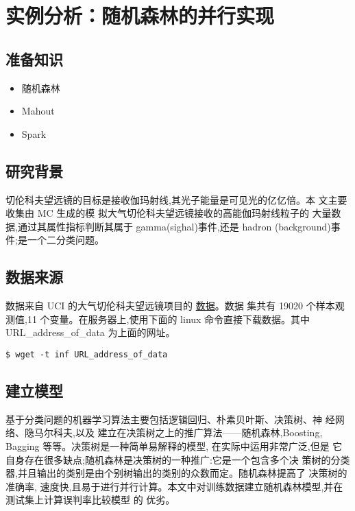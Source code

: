 \section{实例分析：随机森林的并行实现}\label{ux5b9eux4f8bux5206ux6790ux968fux673aux68eeux6797ux7684ux5e76ux884cux5b9eux73b0}

\subsection{准备知识}\label{ux51c6ux5907ux77e5ux8bc6}

\begin{itemize}
\itemsep1pt\parskip0pt
\item
  随机森林
\item
  Mahout
\item
  Spark
\end{itemize}

\subsection{研究背景}\label{ux7814ux7a76ux80ccux666f}

切伦科夫望远镜的目标是接收伽玛射线,其光子能量是可见光的亿亿倍。本
文主要收集由 MC 生成的模 拟大气切伦科夫望远镜接收的高能伽玛射线粒子的
大量数据,通过其属性指标判断其属于 gamma(sighal)事件,还是 hadron
(background)事件;是一个二分类问题。

\subsection{数据来源}\label{ux6570ux636eux6765ux6e90}

数据来自 UCI 的大气切伦科夫望远镜项目的
\href{http://archive.ics.uci.edu/ml/machine-learning-databases/magic/magic04.data}{数据}。数据
集共有 19020 个样本观测值,11 个变量。在服务器上,使用下面的 linux
命令直接下载数据。其中 URL\_address\_of\_data 为上面的网址。

\begin{lstlisting}
$ wget -t inf URL_address_of_data
\end{lstlisting}

\subsection{建立模型}\label{ux5efaux7acbux6a21ux578b}

基于分类问题的机器学习算法主要包括逻辑回归、朴素贝叶斯、决策树、神
经网络、隐马尔科夫,以及
建立在决策树之上的推广算法------随机森林,Boosting, Bagging
等等。决策树是一种简单易解释的模型, 在实际中运用非常广泛,但是
它自身存在很多缺点;随机森林是决策树的一种推广:它是一个包含多个决
策树的分类器,并且输出的类别是由个别树输出的类别的众数而定。随机森林提高了
决策树的准确率,
速度快,且易于进行并行计算。本文中对训练数据建立随机森林模型,并在测试集上计算误判率比较模型
的 优劣。

